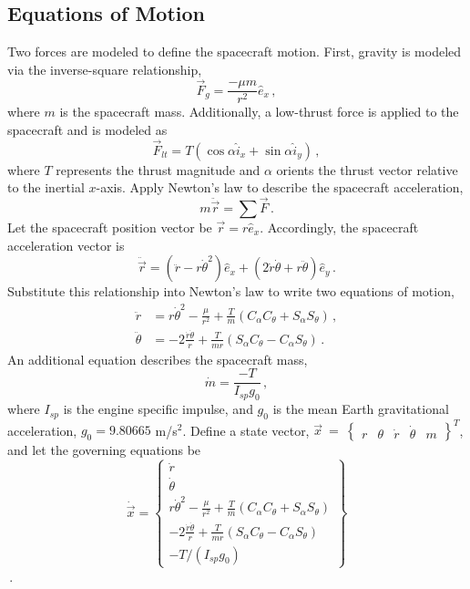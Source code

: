 \documentclass[conf]{new-aiaa}
\begin{document}
\subsection{Equations of Motion}
Two forces are modeled to define the spacecraft motion. First, gravity is modeled via the inverse-square relationship,
\begin{equation}
	\vec{F}_g = \frac{-\mu m}{r^2} \hat{e}_x\,,
\end{equation}
where $m$ is the spacecraft mass. Additionally, a low-thrust force is applied to the spacecraft and is modeled as
\begin{equation}
	\vec{F}_{lt} = T\left( \cos\alpha \hat{i}_x + \sin\alpha \hat{i}_y \right)\,,
\end{equation}
where $T$ represents the thrust magnitude and $\alpha$ orients the thrust vector relative to the inertial $x$-axis. Apply Newton's law to describe the spacecraft acceleration,
\begin{equation}
	m\ddot{\vec{r}} = \sum \vec{F}\,.
\end{equation}
Let the spacecraft position vector be $\vec{r} = r \hat{e}_x$. Accordingly, the spacecraft acceleration vector is
\begin{equation}
	\ddot{\vec{r}} = \left( \ddot{r} - r \dot{\theta}^2 \right) \hat{e}_x + \left( 2 \dot{r} \dot{\theta} + r \ddot{\theta} \right) \hat{e}_y\,.
\end{equation}
Substitute this relationship into Newton's law to write two equations of motion,
\begin{align}
	\ddot{r} &= r\dot{\theta}^2 - \frac{\mu}{r^2} + \frac{T}{m} \left( C_{\alpha} C_{\theta} + S_{\alpha} S_{\theta} \right)\,,\\
	\ddot{\theta} &= -2\frac{\dot{r}\dot{\theta}}{r} + \frac{T}{mr} \left( S_{\alpha} C_{\theta} - C_{\alpha} S_{\theta} \right)\,.
\end{align}
An additional equation describes the spacecraft mass,
\begin{equation}
	\dot{m} = \frac{-T}{I_{sp} g_0}\,,
\end{equation}
where $I_{sp}$ is the engine specific impulse, and $g_0$ is the mean Earth gravitational acceleration, $g_0 = 9.80665$ m/s$^2$. Define a state vector, $\vec{x}~=~\begin{Bmatrix}r & \theta & \dot{r} & \dot{\theta} & m \end{Bmatrix}^T$, and let the governing equations be
\begin{equation}
	\dot{\vec{x}} = \begin{Bmatrix} 
		\dot{r}\\ \dot{\theta}\\
		r\dot{\theta}^2 - \frac{\mu}{r^2} + \frac{T}{m} \left( C_{\alpha} C_{\theta} + S_{\alpha} S_{\theta} \right)\\
		-2\frac{\dot{r}\dot{\theta}}{r} + \frac{T}{mr} \left( S_{\alpha} C_{\theta} - C_{\alpha} S_{\theta} \right)\\
		-T/(I_{sp} g_0)
	\end{Bmatrix}
	\label{eq:dynamics}
\end{equation}\,.
\end{document}
